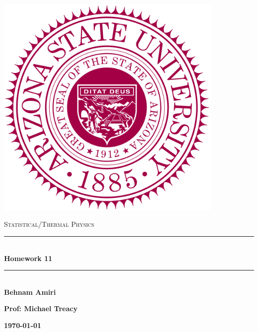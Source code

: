 \documentclass[fleqn]{article}
\begin{document}
  \begin{titlepage}

    \newcommand{\HRule}{\rule{\linewidth}{0.5mm}}

    \center

    \begin{center}
      \includegraphics[height=11cm, width=11cm]{asu.png}
    \end{center}

    \vline

    \textsc{\LARGE Statistical/Thermal Physics}\\[1.5cm]

    \HRule \\[0.5cm]
    { \huge \bfseries Homework 11}\\[0.4cm] 
    \HRule \\[1.0cm]

    \textbf{Behnam Amiri}

    \bigbreak

    \textbf{Prof: Michael Treacy}

    \bigbreak

    \textbf{{\large \today}\\[2cm]}

    \vfill

  \end{titlepage}
\end{document}

